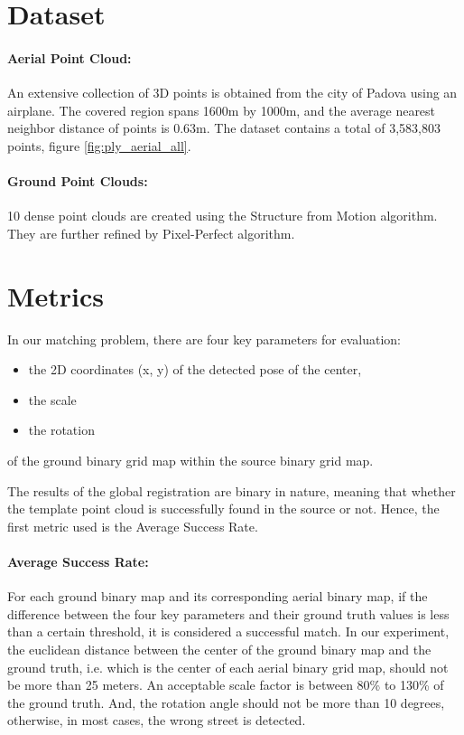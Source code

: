 \documentclass[11pt]{article}
\begin{document}
    \section{Dataset}
    \paragraph{Aerial Point Cloud:} An extensive collection of 3D points is obtained from the city of Padova
    using an airplane. The covered region spans 1600m by 1000m, and the average nearest neighbor distance
    of points is 0.63m. The dataset contains a total of 3,583,803 points, figure \ref{fig:ply_aerial_all}.
    \paragraph{Ground Point Clouds:} 10 dense point clouds are created using the Structure from Motion algorithm.
    They are further refined by Pixel-Perfect algorithm.

    \section{Metrics}
    In our matching problem, there are four key parameters for evaluation:
    \begin{itemize}
        \item the 2D coordinates (x, y) of the detected pose of the center,
        \item the scale
        \item the rotation
    \end{itemize}
    of the ground binary grid map within the source binary grid map.

    The results of the global registration are binary in nature, meaning that whether the template point cloud
    is successfully found in the source or not. Hence, the first metric used is the Average Success Rate.
    \paragraph{Average Success Rate:} For each ground binary map and its corresponding aerial binary map, if the difference
    between the four key parameters and their ground truth values is less than a certain threshold, it is considered
    a successful match. In our experiment, the euclidean distance between the center of the ground binary map and the ground
    truth, i.e. which is the center of each aerial binary grid map, should not be more than 25 meters. An acceptable
    scale factor is between 80\% to 130\% of the ground truth. And, the rotation angle should not be more than 10
    degrees, otherwise, in most cases, the wrong street is detected.
\end{document}
